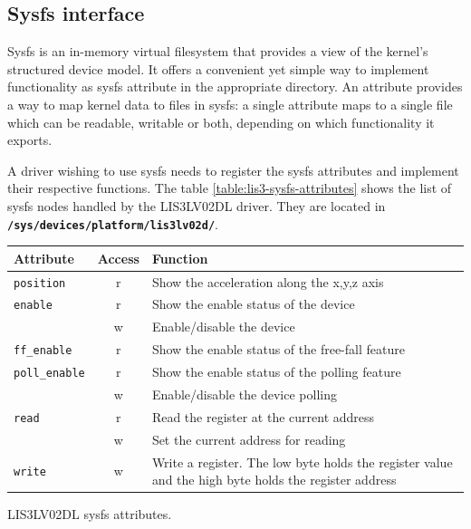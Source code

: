 \documentclass[a4paper,10pt]{article}
\makeatletter
\newenvironment{tablehere}{\def\@captype{table}}{}
\newcommand{\keyword}[1]{\texttt{\textbf{#1}}}
\makeatother
\begin{document}
\begin{multicols}{2}
\subsection{Sysfs interface}
\label{sec:lis3_sysfs}

Sysfs is an in-memory virtual filesystem that provides a view of the kernel's
structured device model. It offers a convenient yet simple way to implement
functionality as sysfs attribute in the appropriate directory. An attribute
provides a way to map kernel data to files in sysfs: a single attribute maps to
a single file which can be readable, writable or both, depending on which
functionality it exports.

A driver wishing to use sysfs needs to register the sysfs attributes and implement
their respective functions. The table \ref{table:lis3-sysfs-attributes} shows
the list of sysfs nodes handled by the LIS3LV02DL driver. They are located in
\keyword{/sys/devices/platform/lis3lv02d/}.

\begin{tablehere}
	\centering
	\renewcommand{\arraystretch}{1.2}	
	\begin{tabular}{l c p{4cm}}
		\hline
		Attribute & Access & Function \\
		\hline
		\texttt{position} & r & Show the acceleration along the x,y,z axis \\
		\hline
		\texttt{enable} & r & Show the enable status of the device \\
						& w & Enable/disable the device \\
		\hline
		\texttt{ff\_enable} & r & Show the enable status of the free-fall 
					 			  feature \\
		\hline
		\texttt{poll\_enable} & r & Show the enable status of the polling
									feature \\
							  & w & Enable/disable the device polling \\
		\hline
		\texttt{read} & r & Read the register at the current address \\
					  & w & Set the current address for reading \\
		\hline
		\texttt{write} & w & Write a register. The low byte holds the register
							 value and the high byte holds the register address \\
		\hline
	\end{tabular}
	\caption{LIS3LV02DL sysfs attributes.}
	\label{table:lis3-sysfs-attributes}
\end{tablehere}


\end{multicols}
\end{document}
